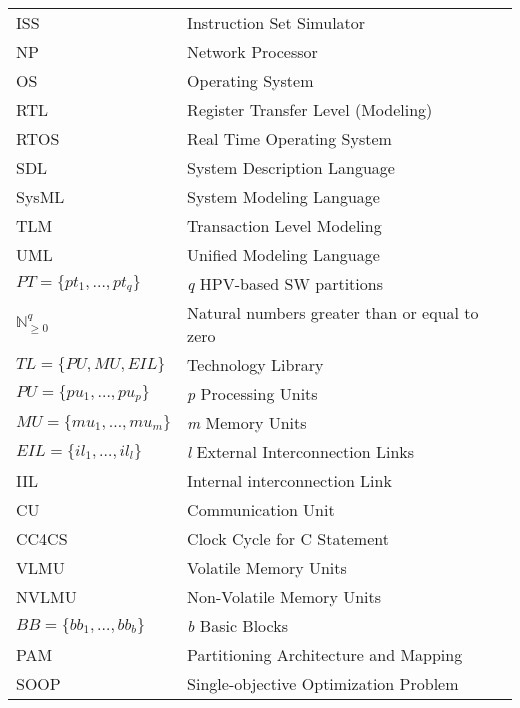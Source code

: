 \begin{center}
\begin{longtable}{ll}
    ISS                                     & Instruction Set Simulator \\
    NP                                      & Network Processor \\
    OS                                      & Operating System \\
    RTL                                     & Register Transfer Level (Modeling) \\
    RTOS                                    & Real Time Operating System \\
    SDL                                     & System Description Language \\
    SysML                                   & System Modeling Language \\
    TLM                                     & Transaction Level Modeling \\
    UML                                     & Unified Modeling Language \\
    $PT = \{pt_{1}, {\dots}, pt_{q}\}$      & \textit{q} HPV-based SW partitions \\
    $\mathbb{N}_{\geq 0}^{q}$               & Natural numbers greater than or equal to zero \\
    $TL = \{PU, MU, EIL\}$                  & Technology Library \\
    $PU = \{pu_{1}, {\dots}, pu_{p}\}$      & \textit{p} Processing Units \\
    $MU = \{mu{}_{1}, {\dots}, mu{}_{m}\}$  & \textit{m} Memory Units \\
    $EIL = \{il{}_{1}, {\dots}, il{}_{l}\}$ & \textit{l} External Interconnection Links \\
    IIL                                     & Internal interconnection Link \\
    CU                                      & Communication Unit \\
    CC4CS                                   & Clock Cycle for C Statement \\
    VLMU                                    & Volatile Memory Units \\
    NVLMU                                   & Non-Volatile Memory Units \\
    $BB = \{bb{}_{1}, {\dots}, bb{}_{b}\}$  & \textit{b} Basic Blocks \\
    PAM                                     & Partitioning Architecture and Mapping \\
    SOOP                                     & Single-objective Optimization Problem \\

\end{longtable}
\end{center}
